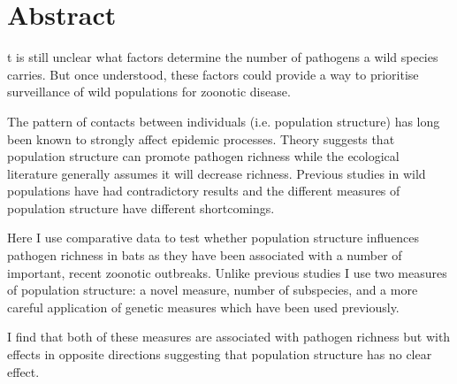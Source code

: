 \clearpage







\section{Abstract}


t is still unclear what factors determine the number of pathogens a wild species carries.
But once understood, these factors could provide a way to prioritise surveillance of wild populations for zoonotic disease.



% 

The pattern of contacts between individuals (i.e. population structure) has long been known to strongly affect epidemic processes.
Theory suggests that population structure can promote pathogen richness while the ecological literature generally assumes it will decrease richness.
Previous studies in wild populations have had contradictory results and the different measures of population structure have different shortcomings.



Here I use comparative data to test whether population structure influences pathogen richness in bats as they have been associated with a number of important, recent zoonotic outbreaks.
Unlike previous studies I use two measures of population structure: a novel measure, number of subspecies, and a more careful application of genetic measures which have been used previously.


I find that both of these measures are associated with pathogen richness but with effects in opposite directions suggesting that population structure has no clear effect.



